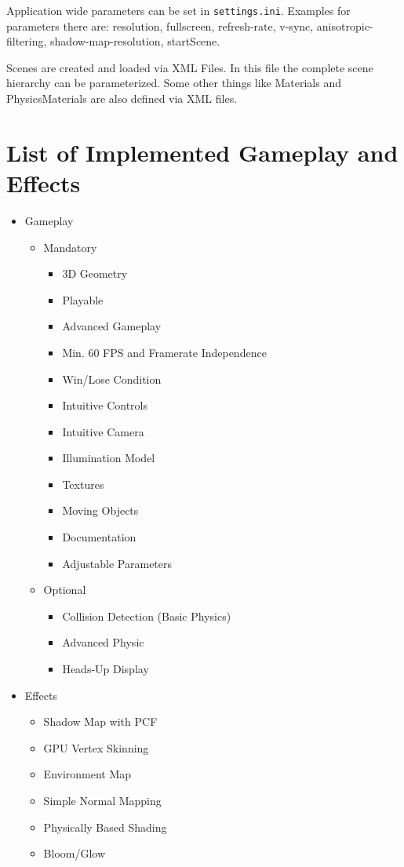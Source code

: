 \documentclass{article}
\begin{document}
    Application wide parameters can be set in \verb|settings.ini|. Examples for parameters there are: resolution, fullscreen, refresh-rate, v-sync, anisotropic-filtering, shadow-map-resolution, startScene.

    Scenes are created and loaded via XML Files. In this file the complete scene hierarchy can be parameterized. Some other things like Materials and PhysicsMaterials are also defined via XML files.


    \section{List of Implemented Gameplay and Effects}

    \begin{itemize}
        \item Gameplay
        \begin{itemize}
            \item Mandatory
            \begin{itemize}
                \item 3D Geometry
                \item Playable
                \item Advanced Gameplay
                \item Min. 60 FPS and Framerate Independence
                \item Win/Lose Condition
                \item Intuitive Controls
                \item Intuitive Camera
                \item Illumination Model
                \item Textures
                \item Moving Objects
                \item Documentation
                \item Adjustable Parameters
            \end{itemize}

            \item Optional
            \begin{itemize}
                \item Collision Detection (Basic Physics)
                \item Advanced Physic
                \item Heads-Up Display
            \end{itemize}
        \end{itemize}
        \item Effects
        \begin{itemize}
            \item Shadow Map with PCF
            \item GPU Vertex Skinning
            \item Environment Map
            \item Simple Normal Mapping
            \item Physically Based Shading
            \item Bloom/Glow
        \end{itemize}
    \end{itemize}
\end{document}
